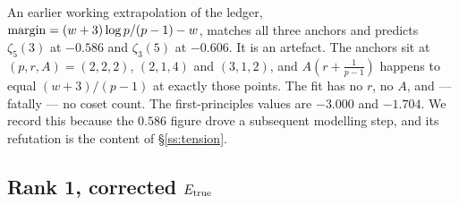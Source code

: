 \begin{remark}\label{rem:fitted}
An earlier working extrapolation of the ledger, $\operatorname{margin}=(w+3)\log p/(p-1)-w$, matches all
three anchors and predicts $\zeta_5(3)$ at $-0.586$ and $\zeta_3(5)$ at $-0.606$. It is an
artefact. The anchors sit at $(p,r,A)=(2,2,2)$, $(2,1,4)$ and $(3,1,2)$, and
$A(r+\tfrac1{p-1})$ happens to equal $(w+3)/(p-1)$ at exactly those points. The fit has no
$r$, no $A$, and --- fatally --- no coset count. The first-principles values are $-3.000$ and
$-1.704$. We record this because the $0.586$ figure drove a subsequent modelling step, and
its refutation is the content of \S\ref{ss:tension}.
\end{remark}

\subsection{Rank 1, corrected \texorpdfstring{$E_{\mathrm{true}}$}{E-true}}\label{ss:map62}

